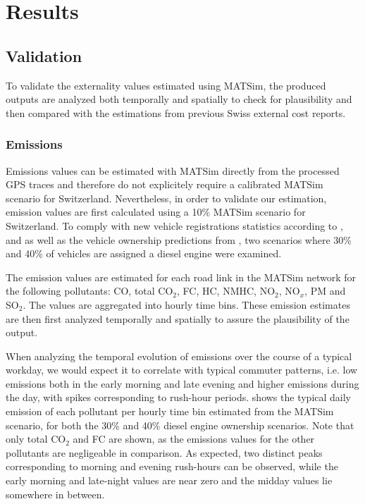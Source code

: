 \section{Results}
\subsection{Validation}
To validate the externality values estimated using MATSim, the produced outputs are analyzed both temporally and spatially to check for plausibility and then compared with the estimations from previous Swiss external cost reports.

\subsubsection{Emissions}
Emissions values can be estimated with MATSim directly from the processed GPS traces and therefore do not explicitely require a calibrated MATSim scenario for Switzerland.
Nevertheless, in order to validate our estimation, emission values are first calculated using a 10\% MATSim scenario for Switzerland.
To comply with new vehicle registrations statistics according to \citet{autoschweiz2010}, \citet{autoschweiz2012} and \citet{energieVerbrauchEffizienzPersonenwagen2015} as well as the vehicle ownership predictions from \citet{foen2010pollutants}, two scenarios where 30\% and 40\% of vehicles are assigned a diesel engine were examined.

The emission values are estimated for each road link in the MATSim network for the following pollutants: CO, total CO$_2$, FC, HC, NMHC, NO$_2$, NO$_x$, PM and SO$_2$.
The values are aggregated into hourly time bins.
These emission estimates are then first analyzed temporally and spatially to assure the plausibility of the output.

When analyzing the temporal evolution of emissions over the course of a typical workday, we would expect it to correlate with typical commuter patterns, i.e. low emissions both in the early morning and late evening and higher emissions during the day, with spikes corresponding to rush-hour periods.
 shows the typical daily emission of each pollutant per hourly time bin estimated from the MATSim scenario, for both the 30\% and 40\% diesel engine ownership scenarios.
Note that only total CO$_2$ and FC are shown, as the emissions values for the other pollutants are negligeable in comparison.
As expected, two distinct peaks corresponding to morning and evening rush-hours can be observed, while the early morning and late-night values are near zero and the midday values lie somewhere in between.


